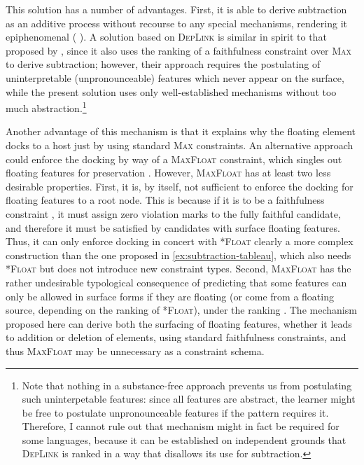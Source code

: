This solution has a number of advantages. First, it is able to derive subtraction as an additive process without recourse to any special mechanisms, rendering it epiphenomenal (\cf \citeauthor{bye09:_exten_expon_and_non_concat_morph} \cite*{bye09:_exten_expon_and_non_concat_morph}). A solution based on \textsc{DepLink} is similar in spirit to that proposed by \citet{bye09:_exten_expon_and_non_concat_morph}, since it also uses the ranking of a faithfulness constraint over \textsc{Max} to derive subtraction; however, their approach requires the postulating of uninterpretable (\ie unpronounceable) features which never appear on the surface, while the present solution uses only well\hyp established mechanisms without too much abstraction.\footnote{Note that nothing in a substance\hyp free approach prevents us from postulating such uninterpetable features: since all features are abstract, the learner might be free to postulate unpronounceable features if the pattern requires it. Therefore, I cannot rule out that  mechanism might in fact be required for some languages, \eg because it can be established on independent grounds that \textsc{DepLink} is ranked in a way that disallows its use for subtraction.}

Another advantage of this mechanism is that it explains why the floating element docks to a host just by using standard \textsc{Max} constraints. An alternative approach could enforce the docking by way of a \textsc{MaxFloat} constraint, which singles out floating features for preservation \citep{wolf2005,wolf-forautosegs}. However, \textsc{MaxFloat} has at least two less desirable properties. First, it is, by itself, not sufficient to enforce the docking for floating features to a root node. This is because if it is to be a faithfulness constraint \citep{moreton2004}, it must assign zero violation marks to the fully faithful candidate, and therefore it must be satisfied by candidates with surface floating features. Thus, it can only enforce docking in concert with \textsc{*Float}\dash
clearly a more complex construction than the one proposed in \ref{ex:subtraction-tableau}, which also needs \textsc{*Float} but does not introduce new constraint types. Second, \textsc{MaxFloat} has the rather undesirable typological consequence of predicting that some features can only be allowed in surface forms if they are floating (or come from a floating source, depending on the ranking of \textsc{*Float}), under the ranking . The mechanism proposed here can derive both the surfacing of floating features, whether it leads to addition or deletion of elements, using standard faithfulness constraints, and thus \textsc{MaxFloat} may be unnecessary as a constraint schema.

